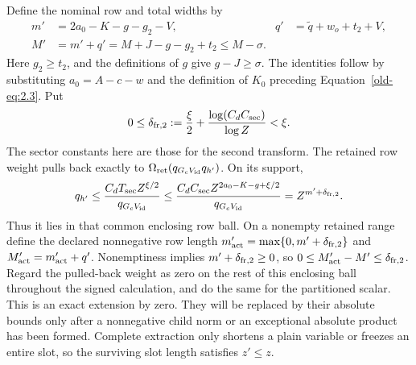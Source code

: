 \documentclass[12pt]{article}
\begin{document}
Define the nominal row and total widths by
\begin{equation}
 \begin{aligned}
 m'&=2a_0-K-g-g_2-V,&
 q'&=\widetilde q+w_o+t_2+V,\\
 M'&=m'+q'
    =M+J-g-g_2+t_2
    \le M-\sigma.
 \end{aligned}
 \label{old-eq:2.13}
\end{equation}
Here \(g_2\ge t_2\), and the definitions of \(g\) give
\(g-J\ge\sigma\).  The identities follow by substituting
\(a_0=A-c-w\) and the definition of \(K_0\) preceding
Equation~\eqref{old-eq:2.3}.  Put
\[
 0\le\delta_{{\rm fr},2}:=\frac\xi2+
       \frac{\log(C_dC_{\rm sec})}{\log Z}<\xi.
\]
The sector constants here are those for the second transform.
The retained row weight pulls back exactly to
\(\Omega_{\rm ret}(q_{G_cV_{\rm id}}q_{h'})\).  On its support,
\[
 q_{h'}\le
 \frac{C_dT_{\rm sec}Z^{\xi/2}}{q_{G_cV_{\rm id}}}
 \le\frac{C_dC_{\rm sec}Z^{2a_0-K-g+\xi/2}}
          {q_{G_cV_{\rm id}}}
 =Z^{m'+\delta_{{\rm fr},2}}.
\]
Thus it lies in that common enclosing row ball.  On a
nonempty retained range define the declared nonnegative row length
\(m'_{\rm act}=\max\{0,m'+\delta_{{\rm fr},2}\}\) and
\(M'_{\rm act}=m'_{\rm act}+q'\).  Nonemptiness implies
\(m'+\delta_{{\rm fr},2}\ge0\), so
\(0\le M'_{\rm act}-M'\le\delta_{{\rm fr},2}\).
Regard the pulled-back weight as zero on the rest of this enclosing
ball throughout the signed calculation, and do the same for the
partitioned scalar.  This is an exact extension by zero.  They will
be replaced by their absolute bounds only after a nonnegative child
norm or an exceptional absolute product has been formed.
Complete extraction only shortens a plain variable or freezes an
entire slot, so the surviving slot length satisfies \(z'\le z\).
\end{document}
